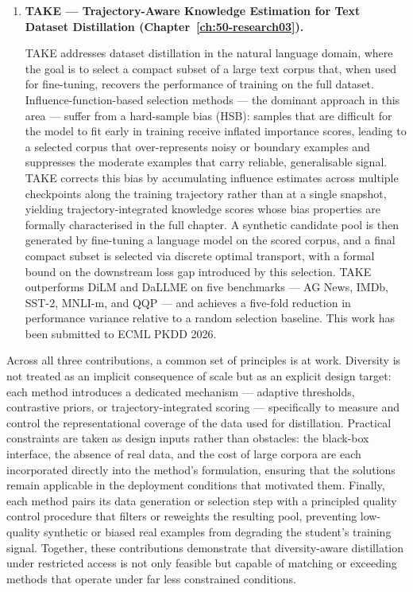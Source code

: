 \begin{enumerate}
  \item \textbf{TAKE — Trajectory-Aware Knowledge Estimation for Text Dataset Distillation (Chapter~\ref{ch:50-research03}).}
    \begin{foldable}
      TAKE addresses dataset distillation in the natural language domain, where the goal is to select a compact subset of a large text corpus that, when used for fine-tuning, recovers the performance of training on the full dataset.
      Influence-function-based selection methods — the dominant approach in this area — suffer from a hard-sample bias (HSB): samples that are difficult for the model to fit early in training receive inflated importance scores, leading to a selected corpus that over-represents noisy or boundary examples and suppresses the moderate examples that carry reliable, generalisable signal.
      TAKE corrects this bias by accumulating influence estimates across multiple checkpoints along the training trajectory rather than at a single snapshot, yielding trajectory-integrated knowledge scores whose bias properties are formally characterised in the full chapter.
      A synthetic candidate pool is then generated by fine-tuning a language model on the scored corpus, and a final compact subset is selected via discrete optimal transport, with a formal bound on the downstream loss gap introduced by this selection.
      TAKE outperforms DiLM and DaLLME on five benchmarks — AG News, IMDb, SST-2, MNLI-m, and QQP — and achieves a five-fold reduction in performance variance relative to a random selection baseline.
      This work has been submitted to ECML PKDD 2026.
    \end{foldable}

\end{enumerate}

\begin{foldable}
  Across all three contributions, a common set of principles is at work.
  Diversity is not treated as an implicit consequence of scale but as an explicit design target: each method introduces a dedicated mechanism — adaptive thresholds, contrastive priors, or trajectory-integrated scoring — specifically to measure and control the representational coverage of the data used for distillation.
  Practical constraints are taken as design inputs rather than obstacles: the black-box interface, the absence of real data, and the cost of large corpora are each incorporated directly into the method's formulation, ensuring that the solutions remain applicable in the deployment conditions that motivated them.
  Finally, each method pairs its data generation or selection step with a principled quality control procedure that filters or reweights the resulting pool, preventing low-quality synthetic or biased real examples from degrading the student's training signal.
  Together, these contributions demonstrate that diversity-aware distillation under restricted access is not only feasible but capable of matching or exceeding methods that operate under far less constrained conditions.
\end{foldable}

